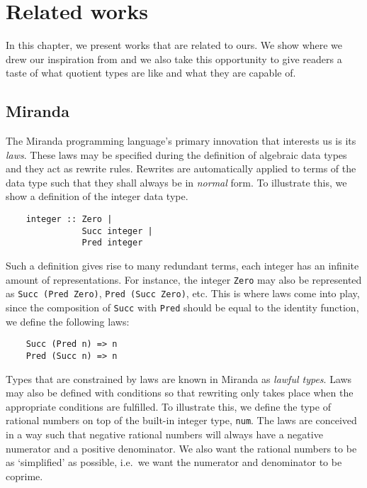 \documentclass[12pt,twoside,maitrise]{dms}
\theoremstyle{definition}
\numberwithin{equation}{section}
\numberwithin{table}{chapter}
\numberwithin{figure}{chapter}
\newcommand\id[1] {\texttt{#1}}
\newcommand\fn[1] {\texttt{#1}}
\begin{document}

\chapter{Related works}

In this chapter, we present works that are related to ours. We show where we
drew our inspiration from and we also take this opportunity to give readers a
taste of what quotient types are like and what they are capable of.

\section{Miranda}

The Miranda programming language's\cite{thompson1986laws, thompson1990lawful}
primary innovation that interests us is its \emph{laws}. These laws may be
specified during the definition of algebraic data types and they act as rewrite
rules. Rewrites are automatically applied to terms of the data type such that
they shall always be in \emph{normal} form. To illustrate this, we show a
definition of the integer data type.

\begin{verbatim}
    integer :: Zero |
               Succ integer |
               Pred integer
\end{verbatim}

Such a definition gives rise to many redundant terms, each integer has an
infinite amount of representations. For instance, the integer \id{Zero} may also
be represented as \fn{Succ (Pred Zero)}, \fn{Pred (Succ Zero)}, etc. This is
where laws come into play, since the composition of \id{Succ} with \id{Pred}
should be equal to the identity function, we define the following laws:

\begin{verbatim}
    Succ (Pred n) => n
    Pred (Succ n) => n
\end{verbatim}

Types that are constrained by laws are known in Miranda as \emph{lawful types}.
Laws may also be defined with conditions so that rewriting only takes place when
the appropriate conditions are fulfilled. To illustrate this, we define the type
of rational numbers on top of the built-in integer type, \id{num}. The laws are
conceived in a way such that negative rational numbers will always have a
negative numerator and a positive denominator. We also want the rational numbers
to be as `simplified' as possible, i.e.\ we want the numerator and denominator
to be coprime.
\end{document}
